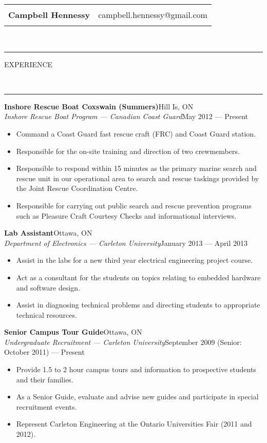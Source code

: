 \documentclass[10pt, letterpaper, oneside]{article}
\makeatletter
\newcommand{\name}{Campbell Hennessy}
\newcommand{\email}{campbell.hennessy@gmail.com}
\newcommand{\HRule}[2]{\textcolor{#1}{\rule{\linewidth}{#2}}}
\newcommand{\sectiontitle}[1]{\begin{minipage}{\textwidth}\HRule{black}{0.25mm}\vspace{-10pt}\begin{center}\Large\MakeUppercase{#1}\end{center}\end{minipage}\\\HRule{light-grey}{0.15mm}\vspace{\baselineskip}}
\newenvironment{ressection}[1]{
  \sectiontitle{#1}}
  {\vspace{-\baselineskip}}
\newcommand{\resitem}[1]{
	\vspace{2pt}
	\item \begin{flushleft} #1 \end{flushleft}
}
\newcommand{\resentryheader}[4]{
	\vspace{-5pt}
	\textbf{#1}\hspace{\stretch{1}}\textcolor{light-grey}{#3}\\
	\textit{#2}\hspace{\stretch{1}}\textcolor{light-grey}{#4}\\
}
\newenvironment{resentry}[4]{
  \begin{minipage}{\textwidth}
	\resentryheader{#1}{#2}{#3}{#4}
        \vspace{-\baselineskip}
	\begin{itemize}[noitemsep,nolistsep]
}{
	\end{itemize}
        \vspace{\baselineskip}
        \end{minipage}
}
\makeatother
\begin{document}
\begin{tabularx}{\linewidth}{X r}
\multirow{3}{*}{\Huge\textbf{\name}} & \\& \email\\\\
\end{tabularx}\\

\begin{ressection}{experience}
  \begin{resentry}{Inshore Rescue Boat Coxswain (Summers)}{Inshore Rescue Boat Program --- Canadian Coast Guard}{Hill Is, ON}{May 2012 --- Present}
    \resitem{Command a Coast Guard fast rescue craft (FRC) and Coast Guard station.}
    \resitem{Responsible for the on-site training and direction of two crewmembers.}
    \resitem{Responsible to respond within 15 minutes as the primary marine search and rescue unit in our operational area to search and rescue taskings provided by the Joint Rescue Coordination Centre.}
    \resitem{Responsible for carrying out public search and rescue prevention programs such as Pleasure Craft Courtesy Checks and informational interviews.}
  \end{resentry}

  \begin{resentry}{Lab Assistant}{Department of Electronics --- Carleton University}{Ottawa, ON}{January 2013 --- April 2013}
    \resitem{Assist in the labs for a new third year electrical engineering project course.}
    \resitem{Act as a consultant for the students on topics relating to embedded hardware and software design.}
    \resitem{Assist in diagnosing technical problems and directing students to appropriate technical resources.}
  \end{resentry}

  \begin{resentry}{Senior Campus Tour Guide}{Undergraduate Recruitment --- Carleton University}{Ottawa, ON}{September 2009 (Senior: October 2011) --- Present}
    \resitem{Provide 1.5 to 2 hour campus tours and information to prospective students and their families.}
    \resitem{As a Senior Guide, evaluate and advise new guides and participate in special recruitment events.}
    \resitem{Represent Carleton Engineering at the Ontario Universities Fair (2011 and 2012).}
  \end{resentry}


\end{ressection}
\end{document}
